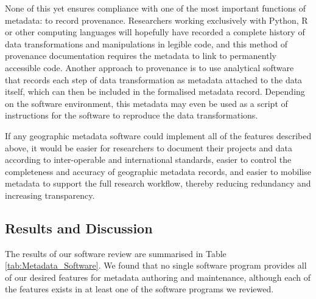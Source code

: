 \documentclass{isprs} %
\begin{document}
None of this yet ensures compliance with one of the most important functions of metadata: to record provenance.
Researchers working exclusively with Python, R or other computing languages will hopefully have recorded a complete history of data transformations and manipulations in legible code, and this method of provenance documentation requires the metadata to link to permanently accessible code.
Another approach to provenance is to use analytical software that records each step of data transformation as metadata attached to the data itself, which can then be included in the formalised metadata record.
Depending on the software environment, this metadata may even be used as a script of instructions for the software to reproduce the data transformations.

If any geographic metadata software could implement all of the features described above, it would be easier for researchers to document their projects and data according to inter-operable and international standards, easier to control the completeness and accuracy of geographic metadata records, and easier to mobilise metadata to support the full research workflow, thereby reducing redundancy and increasing transparency.

\subsection{Results and Discussion}

The results of our software review are summarised in Table \ref{tab:Metadata_Software}.
We found that no single software program provides all of our desired features for metadata authoring and maintenance, although each of the features exists in at least one of the software programs we reviewed.
\end{document}

